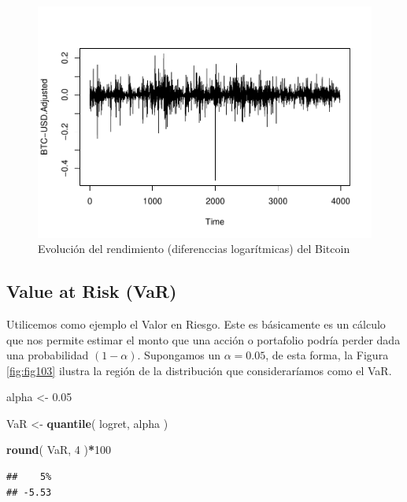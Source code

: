 \documentclass[
]{book}
\newenvironment{Shaded}{\begin{snugshade}}{\end{snugshade}}
\newcommand{\DecValTok}[1]{\textcolor[rgb]{0.00,0.00,0.81}{#1}}
\newcommand{\FloatTok}[1]{\textcolor[rgb]{0.00,0.00,0.81}{#1}}
\newcommand{\FunctionTok}[1]{\textcolor[rgb]{0.13,0.29,0.53}{\textbf{#1}}}
\newcommand{\NormalTok}[1]{#1}
\newcommand{\OtherTok}[1]{\textcolor[rgb]{0.56,0.35,0.01}{#1}}
\newcommand{\SpecialCharTok}[1]{\textcolor[rgb]{0.81,0.36,0.00}{\textbf{#1}}}
\begin{document}
\begin{figure}

{\centering \includegraphics{Notas-Series-Tiempo_files/figure-latex/fig102-1} 

}

\caption{Evolución del rendimiento (diferenccias logarítmicas) del Bitcoin}\label{fig:fig102}
\end{figure}

\hypertarget{value-at-risk-var}{%
\subsection{Value at Risk (VaR)}\label{value-at-risk-var}}

Utilicemos como ejemplo el Valor en Riesgo. Este es básicamente es un cálculo que nos permite estimar el monto que una acción o portafolio podría perder dada una probabilidad \((1-\alpha)\). Supongamos un \(\alpha = 0.05\), de esta forma, la Figura \ref{fig:fig103} ilustra la región de la distribución que consideraríamos como el VaR.

\begin{Shaded}
\begin{Highlighting}[]
\NormalTok{alpha }\OtherTok{\textless{}{-}} \FloatTok{0.05}

\NormalTok{VaR }\OtherTok{\textless{}{-}} \FunctionTok{quantile}\NormalTok{( logret, alpha )}

\FunctionTok{round}\NormalTok{( VaR, }\DecValTok{4}\NormalTok{ )}\SpecialCharTok{*}\DecValTok{100}
\end{Highlighting}
\end{Shaded}

\begin{verbatim}
##    5% 
## -5.53
\end{verbatim}
\end{document}

